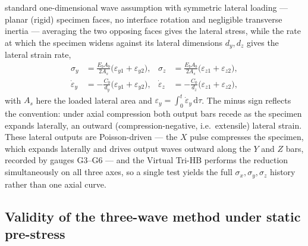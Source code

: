 \documentclass[11pt]{article}
\newcommand{\Cz}{C_{0}}
\newcommand{\eps}{\varepsilon}
\newcommand{\epsd}{\dot{\varepsilon}}
\begin{document}
standard one-dimensional wave assumption with symmetric lateral loading --- planar
(rigid) specimen faces, no interface rotation and negligible transverse inertia
--- averaging the two opposing faces gives the lateral stress, while the rate at
which the specimen widens against its lateral dimensions $d_y,d_z$ gives the
lateral strain rate,
\begin{align}
\sigma_y &=\frac{E_b A_b}{2A_s}\big(\eps_{y1}+\eps_{y2}\big), &
\sigma_z &=\frac{E_b A_b}{2A_s}\big(\eps_{z1}+\eps_{z2}\big), \\
\epsd_y  &=-\frac{\Cz}{d_y}\big(\eps_{y1}+\eps_{y2}\big), &
\epsd_z  &=-\frac{\Cz}{d_z}\big(\eps_{z1}+\eps_{z2}\big),
\label{eq:lateral}
\end{align}
with $A_s$ here the loaded lateral area and $\eps_{y}=\int_0^t\epsd_y\,\mathrm{d}\tau$.
The minus sign reflects the convention: under axial compression both output bars
recede as the specimen expands laterally, an outward (compression-negative,
i.e.\ extensile) lateral strain. These lateral outputs are Poisson-driven --- the
$X$ pulse compresses the specimen, which expands laterally and drives output
waves outward along the $Y$ and $Z$ bars, recorded by gauges G3--G6 --- and the
Virtual Tri-HB performs the reduction simultaneously on all three axes, so a
single test yields the full $\sigma_x,\sigma_y,\sigma_z$ history rather than one
axial curve.

\subsection{Validity of the three-wave method under static pre-stress}\label{sec:prestress}
\end{document}
